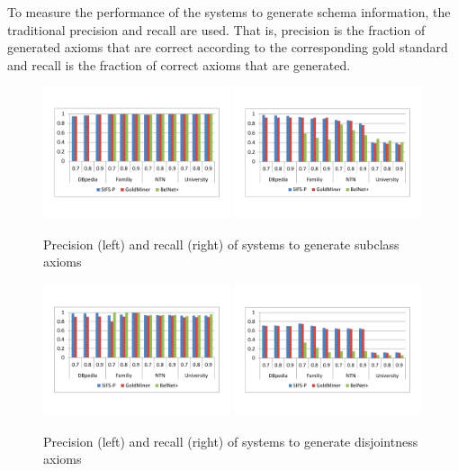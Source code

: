 To measure the performance of the systems to generate schema information, the traditional precision and recall are used. That is, precision is the fraction of generated axioms that are correct according to the corresponding gold standard and recall is the fraction of correct axioms that are generated.


\begin{figure}
  \centering
  \includegraphics[width=0.49\textwidth]{figs/precision-subc.pdf}
  \includegraphics[width=0.49\textwidth]{figs/recall-subc.pdf}
  \caption{Precision (left) and recall (right) of systems to generate subclass axioms}\label{fig:precision-recall-subc}
\end{figure}
\begin{figure}
  \centering
  \includegraphics[width=0.49\textwidth]{figs/precision-disj.pdf}
  \includegraphics[width=0.49\textwidth]{figs/recall-disj.pdf}
  \caption{Precision (left) and recall (right) of systems to generate disjointness axioms}\label{fig:precision-recall-disj}
\end{figure}


